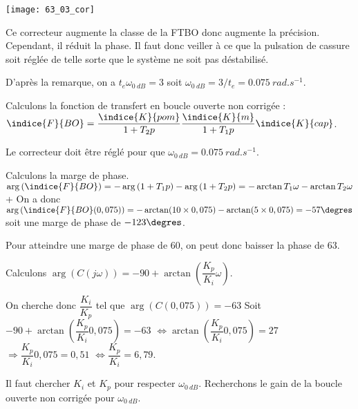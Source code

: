 \begin{center}
\texttt{[image: 63\_03\_cor]}
\end{center}


\else 
\fi


\ifprof
Ce correcteur augmente la classe de la FTBO donc augmente la précision. 
Cependant, il réduit la phase. Il faut donc veiller à ce que la pulsation de cassure soit réglée de telle sorte que le système ne soit pas déstabilisé. 
\else 
\fi


\ifprof
D'après la remarque, on a $t_e \omega_{\SI{0}{dB}}=3$ soit $\omega_{\SI{0}{dB}} =3/t_e = \SI{0,075}{rad.s^{-1}}$.
\else 
\fi


\ifprof
Calculons la fonction de transfert en boucle ouverte non corrigée : 
$\indice{F}{BO}=\dfrac{\indice{K}{pom}}{1+T_2 p}\dfrac{\indice{K}{m}}{1+T_1 p} \indice{K}{cap}$.

Le correcteur doit être réglé pour que $\omega_{\SI{0}{dB}} =\SI{0,075}{rad.s^{-1}}$. 

Calculons la marge de phase. 
$\arg\left(\indice{F}{BO}\right)=-\arg\left(1+T_1p\right)-\arg\left(1+T_2p\right) = -\arctan T_1 \omega -\arctan T_2 \omega $
+
On a donc $\arg\left(\indice{F}{BO}(0,075)\right) = -\arctan (10 \times  0,075) -\arctan (5 \times  0,075)=-57\degres$ soit une marge de phase de $-123\degres$.

Pour atteindre une marge de phase de 60\degres, on peut donc baisser la phase de 63\degres.

Calculons $\arg\left(C(j\omega)\right)=-90+\arctan \left(\dfrac{K_p}{K_i}\omega\right)$.

On cherche donc $\dfrac{K_i}{K_p}$ tel que $\arg\left(C(0,075)\right)=-63$
Soit 
$-90+\arctan \left(\dfrac{K_p}{K_i}0,075\right) =-63$
$\Leftrightarrow \arctan \left(\dfrac{K_p}{K_i}0,075\right) =27$
$\Rightarrow  \dfrac{K_p}{K_i}0,075 =0,51$
$\Leftrightarrow  \dfrac{K_p}{K_i}=6,79$.


\else 
\fi


\ifprof
Il faut chercher $K_i$ et $K_p$ pour respecter $\omega_{\SI{0}{dB}}$. Recherchons le gain de la boucle ouverte non corrigée pour $\omega_{\SI{0}{dB}}$.

